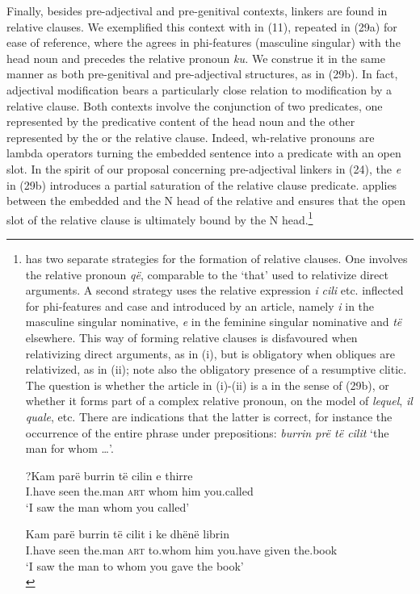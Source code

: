 \documentclass[output=paper]{langsci/langscibook}
\begin{document}
  Finally, besides pre-ad\-jec\-ti\-val and pre-genitival contexts, linkers are found in relative clauses. We exemplified this context with   in (11), repeated in (29a) for ease of reference, where the  agrees in phi-features (masculine singular) with the head noun and precedes the relative pronoun \textit{ku.} We construe it in the same manner as both pre-genitival and pre-ad\-jec\-ti\-val  structures, as in (29b). In fact, adjectival modification bears a particularly close relation to modification by a relative clause. Both contexts involve the conjunction of two predicates, one represented by the predicative content of the head noun and the other represented by the  or the relative clause. Indeed, wh-relative pronouns are lambda operators turning the embedded sentence into a predicate with an open slot. In the spirit of our proposal concerning pre-ad\-jec\-ti\-val linkers in (24), the  \textit{e} in (29b) introduces a partial saturation of the relative clause predicate.  applies between the embedded  and the N head of the relative and ensures that the open slot of the relative clause is ultimately bound by the N head.\footnote{ has two separate strategies for the formation of relative clauses. One involves the relative pronoun \textit{që}, comparable to the  ‘that’ used to relativize direct arguments. A second strategy uses the relative expression \textit{i} \textit{cili} etc. inflected for phi-features and case and introduced by an article, namely \textit{i} in the masculine singular nominative, \textit{e} in the feminine singular nominative and \textit{të} elsewhere. This way of forming relative clauses is disfavoured when relativizing direct arguments, as in (i), but is obligatory when obliques are relativized, as in (ii); note also the obligatory presence of a resumptive clitic. The question is whether the article in (i)-(ii) is a  in the sense of (29b), or whether it forms part of a complex relative pronoun, on the model of  \textit{lequel},  \textit{il quale}, etc. There are indications that the latter is correct, for instance the occurrence of the entire phrase under prepositions: \textit{burrin prë të cilit} ‘the man for whom …’.
  
  \ea   \gll    ?Kam  parë   burrin   të   cilin   e   thirre\\
                I.have   seen   the.man  \textsc{art}   whom  him   you.called\\
  \glt  ‘I saw the man whom you called’
  \z
  
  \ea   \gll    Kam  parë   burrin   të   cilit     i   ke     dhënë   librin\\
                I.have   seen  the.man  \textsc{art}   to.whom    him   you.have   given   the.book\\
        \glt    ‘I saw the man to whom you gave the book’\\
\z}  
\end{document}
